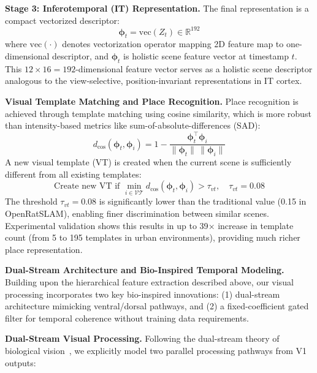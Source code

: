 \textbf{Stage 3: Inferotemporal (IT) Representation.} The final representation is a compact vectorized descriptor:
\begin{equation}
    \boldsymbol{\phi}_t=\mathrm{vec}(Z_t)\in\mathbb{R}^{192}
\end{equation}
where $\mathrm{vec}(\cdot)$ denotes vectorization operator mapping 2D feature map to one-dimensional descriptor, and $\boldsymbol{\phi}_t$ is holistic scene feature vector at timestamp $t$.
This $12 \times 16 = 192$-dimensional feature vector serves as a holistic scene descriptor analogous to the view-selective, position-invariant representations in IT cortex.

\textbf{Visual Template Matching and Place Recognition.} Place recognition is achieved through template matching using cosine similarity, which is more robust than intensity-based metrics like sum-of-absolute-differences (SAD):
\begin{equation}
    d_{\cos}(\boldsymbol{\phi}_t,\boldsymbol{\phi}_i)=1-\frac{\boldsymbol{\phi}_t^\top\boldsymbol{\phi}_i}{\lVert\boldsymbol{\phi}_t\rVert\,\lVert\boldsymbol{\phi}_i\rVert}
\end{equation}
A new visual template (VT) is created when the current scene is sufficiently different from all existing templates:
\begin{equation}
    \text{Create new VT if }\min_{i \in \mathcal{VT}} d_{\cos}(\boldsymbol{\phi}_t, \boldsymbol{\phi}_i)>\tau_{vt},\quad \tau_{vt}=0.08
\end{equation}
The threshold $\tau_{vt}=0.08$ is significantly lower than the traditional value (0.15 in OpenRatSLAM), enabling finer discrimination between similar scenes. Experimental validation shows this results in up to 39$\times$ increase in template count (from 5 to 195 templates in urban environments), providing much richer place representation.

\textbf{Dual-Stream Architecture and Bio-Inspired Temporal Modeling.} Building upon the hierarchical feature extraction described above, our visual processing incorporates two key bio-inspired innovations: (1) dual-stream architecture mimicking ventral/dorsal path\-ways, and (2) a fixed-coefficient gated filter for temporal coherence without training data requirements.

\textbf{Dual-Stream Visual Processing.}
Following the dual-stream theory of biological vision~\cite{Goodale1992, Mishkin1983}, we explicitly model two parallel processing path\-ways from V1 outputs:

